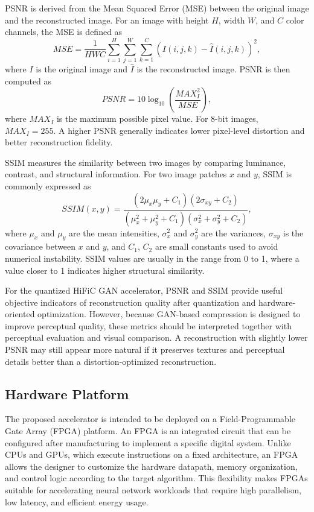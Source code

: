 PSNR is derived from the Mean Squared Error (MSE) between the original image and the reconstructed image. For an image with height $H$, width $W$, and $C$ color channels, the MSE is defined as
\begin{equation}
MSE = \frac{1}{HWC}\sum_{i=1}^{H}\sum_{j=1}^{W}\sum_{k=1}^{C}\left(I(i,j,k)-\hat{I}(i,j,k)\right)^2,
\end{equation}
where $I$ is the original image and $\hat{I}$ is the reconstructed image. PSNR is then computed as
\begin{equation}
PSNR = 10\log_{10}\left(\frac{MAX_I^2}{MSE}\right),
\end{equation}
where $MAX_I$ is the maximum possible pixel value. For 8-bit images, $MAX_I = 255$. A higher PSNR generally indicates lower pixel-level distortion and better reconstruction fidelity.

SSIM measures the similarity between two images by comparing luminance, contrast, and structural information. For two image patches $x$ and $y$, SSIM is commonly expressed as
\begin{equation}
SSIM(x,y) = \frac{(2\mu_x\mu_y + C_1)(2\sigma_{xy} + C_2)}{(\mu_x^2 + \mu_y^2 + C_1)(\sigma_x^2 + \sigma_y^2 + C_2)},
\end{equation}
where $\mu_x$ and $\mu_y$ are the mean intensities, $\sigma_x^2$ and $\sigma_y^2$ are the variances, $\sigma_{xy}$ is the covariance between $x$ and $y$, and $C_1$, $C_2$ are small constants used to avoid numerical instability. SSIM values are usually in the range from 0 to 1, where a value closer to 1 indicates higher structural similarity.

For the quantized HiFiC GAN accelerator, PSNR and SSIM provide useful objective indicators of reconstruction quality after quantization and hardware-oriented optimization. However, because GAN-based compression is designed to improve perceptual quality, these metrics should be interpreted together with perceptual evaluation and visual comparison. A reconstruction with slightly lower PSNR may still appear more natural if it preserves textures and perceptual details better than a distortion-optimized reconstruction. \cite{blau2018perception,mentzer2020high,huynh2008scope,wang2004ssim}

\subsection{Hardware Platform}

The proposed accelerator is intended to be deployed on a Field-Programmable Gate Array (FPGA) platform. An FPGA is an integrated circuit that can be configured after manufacturing to implement a specific digital system. Unlike CPUs and GPUs, which execute instructions on a fixed architecture, an FPGA allows the designer to customize the hardware datapath, memory organization, and control logic according to the target algorithm. This flexibility makes FPGAs suitable for accelerating neural network workloads that require high parallelism, low latency, and efficient energy usage. \cite{kuon2008fpga,sze2017efficient}

